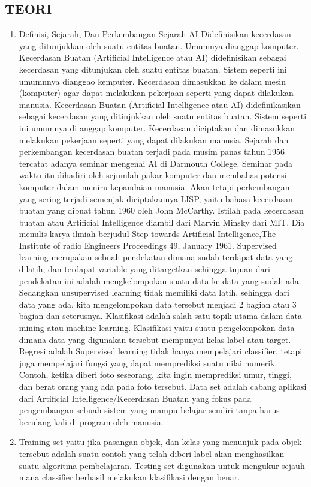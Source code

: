 \subsection{TEORI}
\begin{enumerate}
\item
Definisi, Sejarah, Dan Perkembangan Sejarah AI
\subitem Didefinisikan  kecerdasan yang ditunjukkan oleh suatu entitas buatan. Umumnya dianggap komputer. Kecerdasan Buatan (Artificial Intelligence atau AI) didefinisikan sebagai kecerdasan yang ditunjukan oleh suatu entitas buatan. Sistem seperti ini umumnnya dianggao kemputer. Kecerdasan dimasukkan ke dalam mesin (komputer) agar dapat melakukan pekerjaan seperti yang dapat dilakukan manusia. Kecerdasan Buatan (Artificial Intelligence atau AI) didefinikasikan sebagai kecerdasan yang ditinjukkan oleh suatu entitas buatan. Sistem seperti ini umumnya di anggap komputer. Kecerdasan diciptakan dan dimasukkan melakukan pekerjaan seperti yang dapat dilakukan manusia. 
\subitem Sejarah dan perkembangan kecerdasan buatan terjadi pada musim panas tahun 1956 tercatat adanya seminar mengenai AI di Darmouth College. Seminar pada waktu itu dihadiri oleh sejumlah pakar komputer dan membahas potensi komputer dalam meniru 
kepandaian manusia. Akan tetapi perkembangan yang sering terjadi semenjak diciptakannya LISP, yaitu bahasa kecerdasan buatan yang dibuat tahun 1960 oleh John McCarthy. Istilah pada kecerdasan buatan atau Artificial Intelligence diambil dari Marvin Minsky dari MIT. Dia menulis karya ilmiah berjudul Step towards Artificial Intelligence,The Institute of radio Engineers Proceedings 49, January 1961\cite{ai2011kecerdasani}.
\subitem Supervised learning merupakan sebuah pendekatan dimana sudah terdapat data yang dilatih, dan terdapat variable yang ditargetkan sehingga tujuan dari pendekatan ini adalah mengkelompokan suatu data ke data yang sudah ada. Sedangkan unsupervised 
learning tidak memiliki data latih, sehingga dari data yang ada, kita mengelompokan data tersebut menjadi 2 bagian atau 3 bagian dan seterusnya.
\subitem Klasifikasi adalah salah satu topik utama dalam data mining atau machine learning. Klasifikasi yaitu suatu pengelompokan data dimana data yang digunakan tersebut mempunyai kelas label atau target.
\subitem Regresi adalah Supervised learning tidak hanya mempelajari classifier, tetapi juga mempelajari fungsi yang dapat memprediksi suatu nilai numerik. Contoh, ketika diberi foto seseorang, kita ingin memprediksi umur, tinggi, dan berat orang yang ada pada foto tersebut.
\subitem Data set adalah cabang aplikasi dari Artificial Intelligence/Kecerdasan Buatan yang fokus pada pengembangan sebuah sistem yang mampu belajar sendiri tanpa harus berulang kali di program oleh manusia.
\item Training set yaitu jika pasangan objek, dan kelas yang menunjuk pada objek tersebut adalah suatu contoh yang telah diberi label akan menghasilkan suatu algoritma pembelajaran.
\subitem Testing set digunakan untuk mengukur sejauh mana classifier berhasil melakukan klasifikasi dengan benar.



\end{enumerate}
